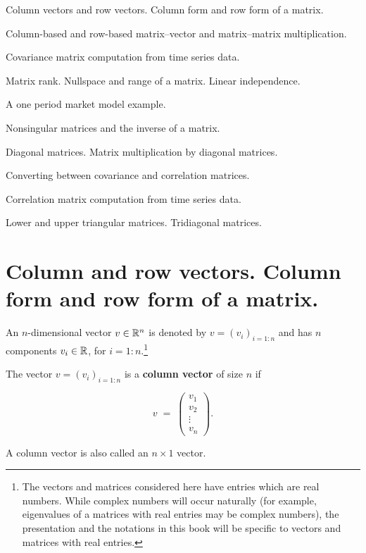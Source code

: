 
\noindent Column vectors and row vectors. Column form and row form of a matrix.
\medskip

\noindent Column-based and row-based matrix--vector and matrix--matrix multiplication.
\medskip

\noindent Covariance matrix computation from time series data.
\medskip

\noindent Matrix rank. Nullspace and range of a matrix. Linear independence.
\medskip

\noindent A one period market model example.
\medskip

\noindent Nonsingular matrices and the inverse of a matrix.
\medskip

\noindent Diagonal matrices. Matrix multiplication by diagonal matrices.
\medskip

\noindent Converting between covariance and correlation matrices.
\medskip

\noindent Correlation matrix computation from time series data.
\medskip

\noindent Lower and upper triangular matrices. Tridiagonal matrices.
\medskip

\section{Column and row vectors. Column form and row form of a matrix.}

An $n$-dimensional vector $v \in \mathbb{R}^n$ is denoted by $v=(v_i)_{i=1:n}$ and has $n$
components $v_i \in \mathbb{R}$, for $i=1:n$.\footnote{The vectors and matrices considered
here have entries which are real numbers. While complex numbers will occur
naturally (for example, eigenvalues of a matrices with real entries may be
complex numbers), the presentation and the notations in this book will be
specific to vectors and matrices with real entries.}

The vector $v=(v_i)_{i=1:n}$ is a \textbf{column vector} of size $n$ if

\begin{equation}
v \;=\; \begin{pmatrix} v_1 \\ v_2 \\ \vdots \\ v_n \end{pmatrix}.
\end{equation}

A column vector is also called an $n\times 1$ vector.

